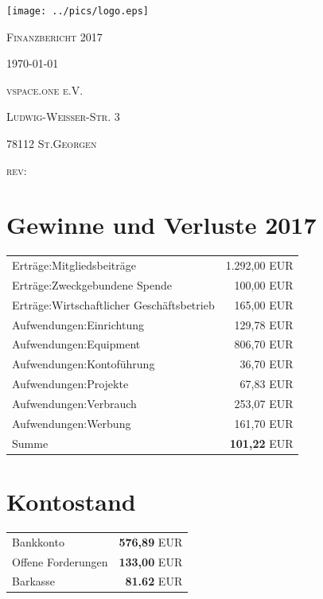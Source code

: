 \documentclass[12pt,a4paper]{article}
\begin{document}
\begin{titlepage}
	\centering
	\texttt{[image: ../pics/logo.eps]}\par\vspace{1cm}
  {\scshape\Huge Finanzbericht 2017 \par}
	\vfill

	{\scshape\large \today\par}
	{\scshape\large vspace.one e.V. \par}
	{\scshape\large Ludwig-Weißer-Str. 3 \par}
	{\scshape\large 78112 St.Georgen \par}
	{\scshape\large rev: \GITAbrHash \par}
	\vspace{1cm}
\end{titlepage}

\section{Gewinne und Verluste 2017}

\begin{tabular}{ l|r }
  Erträge:Mitgliedsbeiträge & 1.292,00 EUR \\
  Erträge:Zweckgebundene Spende & 100,00 EUR \\
  Erträge:Wirtschaftlicher Geschäftsbetrieb & 165,00 EUR \\
  \hline
  Aufwendungen:Einrichtung & 129,78 EUR \\
  Aufwendungen:Equipment & 806,70 EUR \\
  Aufwendungen:Kontoführung & 36,70 EUR \\
  Aufwendungen:Projekte & 67,83 EUR \\
  Aufwendungen:Verbrauch & 253,07 EUR \\
  Aufwendungen:Werbung & 161,70 EUR \\
  \hline
  Summe & \textbf{101,22} EUR \\

\end{tabular}

\section{Kontostand}
\begin{tabular}{ l|r }
Bankkonto & \textbf{576,89} EUR \\
Offene Forderungen & \textbf{133,00} EUR \\
Barkasse & \textbf{81.62} EUR \\

\end{tabular}
\end{document}
